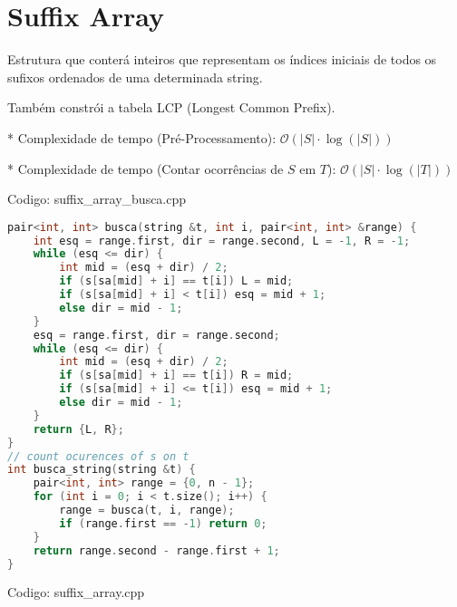 \documentclass[10pt, a4paper, oneside]{book}
\begin{document}
\section{Suffix Array}


Estrutura que conterá inteiros que representam os índices iniciais de todos os sufixos ordenados de uma determinada string.



Também constrói a tabela LCP (Longest Common Prefix).



* Complexidade de tempo (Pré-Processamento): $\mathcal{O}(|S| \cdot \log(|S|))$

* Complexidade de tempo (Contar ocorrências de \(S\) em \(T\)): $\mathcal{O}(|S| \cdot \log(|T|))$

\hfill

Codigo: suffix\_array\_busca.cpp

\begin{lstlisting}[language=C++]
pair<int, int> busca(string &t, int i, pair<int, int> &range) {
    int esq = range.first, dir = range.second, L = -1, R = -1;
    while (esq <= dir) {
        int mid = (esq + dir) / 2;
        if (s[sa[mid] + i] == t[i]) L = mid;
        if (s[sa[mid] + i] < t[i]) esq = mid + 1;
        else dir = mid - 1;
    }
    esq = range.first, dir = range.second;
    while (esq <= dir) {
        int mid = (esq + dir) / 2;
        if (s[sa[mid] + i] == t[i]) R = mid;
        if (s[sa[mid] + i] <= t[i]) esq = mid + 1;
        else dir = mid - 1;
    }
    return {L, R};
}
// count ocurences of s on t
int busca_string(string &t) {
    pair<int, int> range = {0, n - 1};
    for (int i = 0; i < t.size(); i++) {
        range = busca(t, i, range);
        if (range.first == -1) return 0;
    }
    return range.second - range.first + 1;
}\end{lstlisting}
\hfill

Codigo: suffix\_array.cpp
\end{document}
